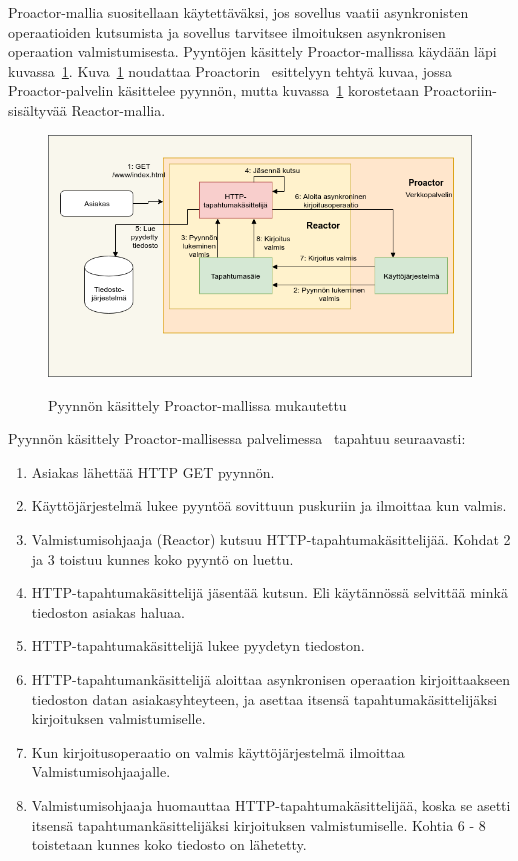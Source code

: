 \documentclass[finnish]{tktltiki2}
\theoremstyle{definition}
\theoremstyle{remark}
\begin{document}
Proactor-mallia suositellaan käytettäväksi, jos sovellus vaatii
asynkronisten operaatioiden kutsumista ja sovellus tarvitsee ilmoituksen
asynkronisen operaation valmistumisesta.
Pyyntöjen käsittely Proactor-mallissa käydään läpi kuvassa~\ref{fig:proactor}.
Kuva~\ref{fig:proactor} noudattaa Proactorin~\cite{hu_applying_1998} esittelyyn tehtyä
kuvaa, jossa Proactor-palvelin käsittelee pyynnön, mutta kuvassa~\ref{fig:proactor}
korostetaan Proactoriin-sisältyvää Reactor-mallia.
\begin{figure}
  \caption{Pyynnön käsittely Proactor-mallissa mukautettu~\cite{hu_applying_1998}}
  \includegraphics[scale=0.5]{Proactor.png}\label{fig:proactor}
\end{figure}
Pyynnön käsittely Proactor-mallisessa palvelimessa~\cite{hu_applying_1998} 
tapahtuu seuraavasti:
    \begin{enumerate}
      \item Asiakas lähettää HTTP GET pyynnön.
      \item Käyttöjärjestelmä lukee pyyntöä sovittuun puskuriin ja ilmoittaa kun valmis.
      \item Valmistumisohjaaja (Reactor) kutsuu HTTP-tapahtumakäsittelijää.
        Kohdat 2 ja 3 toistuu kunnes koko pyyntö on luettu.
      \item HTTP-tapahtumakäsittelijä jäsentää kutsun. Eli
        käytännössä selvittää minkä tiedoston asiakas haluaa.
      \item HTTP-tapahtumakäsittelijä lukee pyydetyn tiedoston.
      \item HTTP-tapahtumankäsittelijä aloittaa asynkronisen operaation
        kirjoittaakseen tiedoston datan asiakasyhteyteen, ja asettaa
        itsensä tapahtumakäsittelijäksi kirjoituksen valmistumiselle.
      \item Kun kirjoitusoperaatio on valmis käyttöjärjestelmä ilmoittaa
        Valmistumisohjaajalle.
      \item Valmistumisohjaaja huomauttaa HTTP-tapahtumakäsittelijää,
        koska se asetti itsensä tapahtumankäsittelijäksi kirjoituksen
        valmistumiselle. Kohtia 6 - 8 toistetaan kunnes koko tiedosto on lähetetty.
    \end{enumerate}
\end{document}
